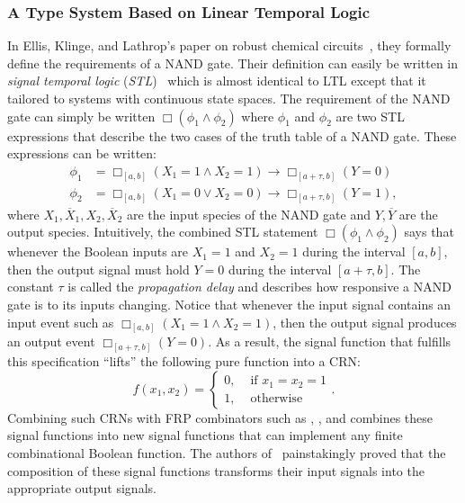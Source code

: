 \subsubsection{A Type System Based on Linear Temporal Logic}
In Ellis, Klinge, and Lathrop's paper on robust chemical circuits~\cite{rdc}, they formally define the requirements of a NAND gate.
Their definition can easily be written in \emph{signal temporal logic} (\emph{STL})~\cite{donze2013,donze2015} which is almost identical to LTL except that it tailored to systems with continuous state spaces.
The requirement of the NAND gate can simply be written \( \Box(\phi_1 \land \phi_2) \) where \( \phi_1 \) and \( \phi_2 \) are two STL expressions that describe the two cases of the truth table of a NAND gate.
These expressions can be written:
\begin{align*}
    \phi_1 &= \Box_{[a,b]} (X_1 = 1 \land X_2 = 1) \rightarrow \Box_{[a+\tau, b]} (Y = 0)\\
    \phi_2 &= \Box_{[a,b]} (X_1 = 0 \lor X_2 = 0)  \rightarrow \Box_{[a+\tau, b]} (Y = 1),
\end{align*}
where \( X_1, \overline{X}_1, X_2, \overline{X}_2  \) are the input species of the NAND gate and \( Y, \overline{Y} \) are the output species.
Intuitively, the combined STL statement \( \Box(\phi_1 \land \phi_2) \) says that whenever the Boolean inputs are \( X_1 = 1 \) and \( X_2 = 1 \) during the interval \( [a,b] \), then the output signal must hold \( Y = 0 \) during the interval \( [a+\tau, b] \).
The constant \( \tau \) is called the \emph{propagation delay} and describes how responsive a NAND gate is to its inputs changing.
Notice that whenever the input signal contains an input event such as \( \Box_{[a,b]}(X_1 = 1 \land X_2 = 1) \), then the output signal produces an output event \( \Box_{[a+\tau, b]}(Y = 0) \).
As a result, the signal function that fulfills this specification ``lifts'' the following pure function into a CRN:
\[
    f(x_1, x_2) =
    \begin{cases}
        0, &\text{ if }x_1 = x_2 = 1\\
        1, &\text{ otherwise}
    \end{cases}.
\]
Combining such CRNs with FRP combinators such as \hask{>>>}, \hask{&&&}, and \hask{***} combines these signal functions into new signal functions that can implement any finite combinational Boolean function.
The authors of~\cite{rdc} painstakingly proved that the composition of these signal functions transforms their input signals into the appropriate output signals.

